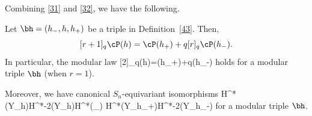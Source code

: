 Combining \eqref{31} and \eqref{32}, we have the following. 

\begin{theorem} \label{2}
	Let $\bh=(h_-,h,h_+)$ be a triple in Definition~\ref{43}. Then, 
	\[[r+1]_q \cP(h)=\cP(h_+)+q[r]_q \cP(h_-).\]
	In particular, the modular law
	\beq \label{53} [2]_q\cP(h)=\cP(h_+)+q\cP(h_-) \eeq
	holds for a modular triple $\bh$ (when $r=1$).
\end{theorem}

Moreover, we have canonical $S_n$-equivariant isomorphisms
\beq \label{n43} H^*(Y_h)\oplus H^{*-2}(Y_h)\cong H^*(\tY_\bh)\cong 
H^*(Y_{h_+})\oplus H^{*-2}(Y_{h_-})\eeq
for a modular triple $\bh$.


